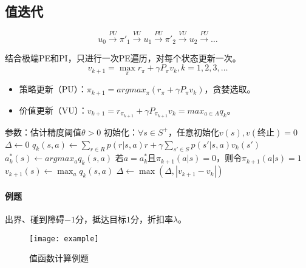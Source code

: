 \documentclass[
12pt, %
a4paper, 
oneside, %
headinclude,footinclude, %
]{scrartcl}
\begin{document}
\subsection[值迭代]{值迭代}
$$ u_0 \xrightarrow{PU} \pi'_1 \xrightarrow{VU} u_1 \xrightarrow{PU} \pi'_2 \xrightarrow{VU} u_2 \xrightarrow{PU} \dots $$

结合极端PE和PI，只进行一次PE遍历，对每个状态更新一次。
$$ v_{k + 1} = \max_{\pi} r_{\pi} + \gamma P_{\pi}v_k, k = 1, 2, 3, \dots $$
\begin{itemize}
\item 策略更新（PU）：$ \pi_{k + 1} = argmax_{\pi}(r_{\pi} + \gamma P_{\pi}v_k) $，贪婪选取。
\item 价值更新（VU）：$ v_{k + 1} = r_{\pi_{k + 1}} + \gamma P_{\pi_{k + 1}}v_k = max_{a \in A} q_k $。
\end{itemize}
\begin{myalgorithm}[值迭代]
\State 参数：估计精度阈值$ \theta > 0 $
\State 初始化：$ \forall s \in S^+ $，任意初始化$ v(s), v(\text{终止}) = 0 $
\Repeat
\State $ \Delta \gets 0 $
\State $ q_k(s, a) \gets \sum_{r \in R} p(r|s, a)r + \gamma \sum_{s' \in S} p(s'|s, a)v_k(s') $
\State $ a^*_k(s) \gets argmax_a q_k(s, a) $ 
\State 若$ a = a^*_k $且$ \pi_{k + 1}(a|s) = 0 $，则令$ \pi_{k + 1}(a|s) = 1 $ 
\State $ v_{k + 1}(s) \gets \max_a q_k(s, a) $ 
\State $ \Delta \gets \max(\Delta, |v_{k + 1} - v_k|) $ 
\EndFor
\EndFor
\Until{$ \Delta < \theta $}
\end{myalgorithm}
\paragraph{例题}
出界、碰到障碍$ -1 $分，抵达目标$ 1 $分，折扣率$ \lambda $。
\begin{figure}[H]
\centering 
\texttt{[image: example]} 
\caption{值函数计算例题}
\end{figure}
\end{document}
